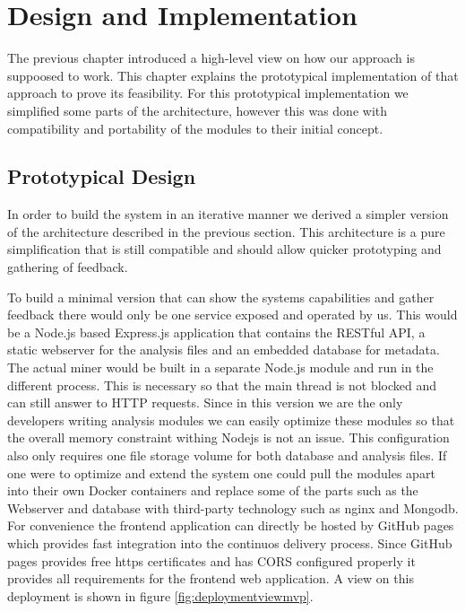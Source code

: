 \chapter{Design and Implementation} \label{chapDesign}
The previous chapter introduced a high-level view on how our approach is suppoosed to work. This chapter explains the prototypical implementation of that approach to prove its feasibility. For this prototypical implementation we simplified some parts of the architecture, however this was done with compatibility and portability of the modules to their initial concept.

\section{Prototypical Design} 
In order to build the system in an iterative manner we derived a simpler version of the architecture described in the previous section. This architecture is a pure simplification that is still compatible and should allow quicker prototyping and gathering of feedback. 

To build a minimal version that can show the systems capabilities and gather feedback there would only be one service exposed and operated by us. This would be a Node.js based Express.js application that contains the RESTful API, a static webserver for the analysis files and an embedded database for metadata. The actual miner would be built in a separate Node.js module and run in the different process. This is necessary so that the main thread is not blocked and can still answer to HTTP requests. Since in this version we are the only developers writing analysis modules we can easily optimize these modules so that the overall memory constraint withing Nodejs is not an issue. This configuration also only requires one file storage volume for both database and analysis files. If one were to optimize and extend the system one could pull the modules apart into their own Docker containers and replace some of the parts such as the Webserver and database with third-party technology such as nginx and Mongodb.
For convenience the frontend application can directly be hosted by GitHub pages which provides fast integration into the continuos delivery process. Since GitHub pages provides free https certificates and has CORS configured properly it provides all requirements for the frontend web application. A view on this deployment is shown in figure \ref{fig:deploymentviewmvp}.

